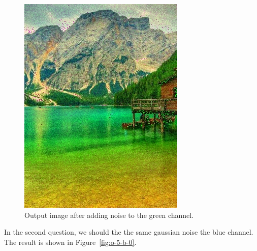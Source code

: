 \documentclass[]{IEEEtran}
\begin{document}
  \begin{figure}[!h]
    \centering
    \includegraphics[width=0.8\hsize]{../output/o-5-a-0.jpg}
    \caption{Output image after adding noise to the green channel.}
    \label{fig:o-5-a-0}
  \end{figure}
  
  In the second question, we should the the same gaussian noise the blue channel. The result is shown in Figure~\ref{fig:o-5-b-0}.
  
\end{document}
